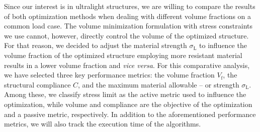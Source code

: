 Since our interest is in ultralight structures, we are willing to compare the results of both optimization methods when dealing with different volume fractions on a common load case. The volume minimization formulation with stress constraints we use cannot, however, directly control the volume of the optimized structure. For that reason, we decided to adjust the material strength $\sigma_\text{L}$ to influence the volume fraction of the optimized structure \ie employing more resistant material results in a lower volume fraction and \textit{vice versa}. For this comparative analysis, we have selected three key performance metrics: the volume fraction $V_\text{f}$, the structural compliance $C$, and the maximum material allowable -- or strength $\sigma_\text{L}$. Among these, we classify stress limit as the active metric used to influence the optimization, while volume and compliance are the objective of the optimization and a passive metric, respectively. In addition to the aforementioned performance metrics, we will also track the execution time of the algorithms.

